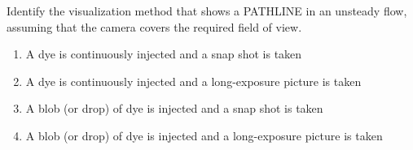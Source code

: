 \documentclass[journal]{IEEEtran}
\begin{document}
\begin{enumerate}
{           	Identify the visualization method that shows a PATHLINE in an unsteady flow, assuming that the
           	camera covers the required field of view.
				\begin{enumerate}
					\item A dye is continuously injected and a snap shot is taken
					\item A dye is continuously injected and a long-exposure picture is taken
					\item A blob (or drop) of dye is injected and a snap shot is taken
					\item A blob (or drop) of dye is injected and a long-exposure picture is taken
				\end{enumerate}

        
        }
   
    \end{enumerate}
\end{document}
